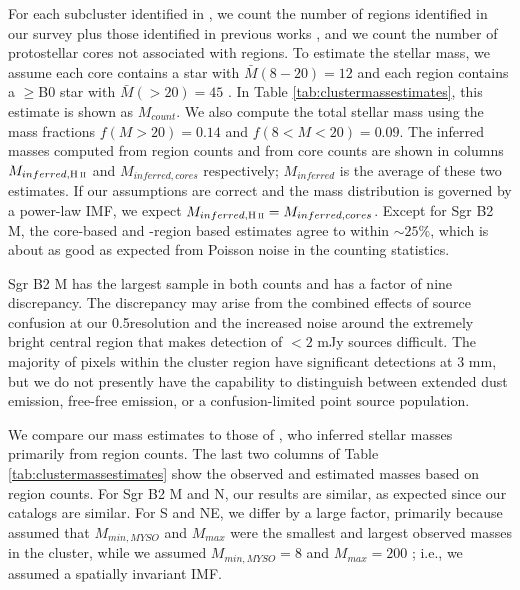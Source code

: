 \documentclass[twocolumn]{aastex61}
\begin{document}

For each subcluster identified in \citet[][see Figure
\ref{fig:overview}]{Schmiedeke2016a}, we count the number of \hii regions
identified in our
survey plus those identified in previous works \citep{de-Pree1996a}, and
we count the number of protostellar cores not associated with \hii regions.
To estimate the stellar mass, we assume each core contains a star
with $\bar{M}(8-20) = 12$ \msun and each \hii region contains a $\geq$B0 star
with $\bar{M}(>20) = 45$ \msun.  In Table \ref{tab:clustermassestimates},
this estimate is shown as $M_{count}$.  We also compute the total stellar
mass using the mass fractions $f(M>20) = 0.14$ and $f(8<M<20)=0.09$.
The inferred masses computed from \hii region counts and from core
counts are shown in columns $M_{inferred,\hii}$ and $M_{inferred,cores}$
respectively; $M_{inferred}$ is the average of these two estimates.
If our assumptions are correct and the mass distribution is governed
by a power-law IMF, we expect $M_{inferred,\hii} = M_{inferred,cores}$.
Except for Sgr B2 M, the core-based and \hii-region based estimates agree
to within $\sim25\%$, which is about as good as expected from Poisson
noise in the counting statistics.  

Sgr B2 M has the largest sample in both counts and has a factor of nine
discrepancy. The discrepancy may arise from the combined effects of source
confusion at our 0.5\arcsec resolution and the increased noise around the
extremely bright central region that makes detection of $<2$ mJy sources
difficult.  The majority of pixels within the cluster region have significant
detections at 3 mm, but we do not presently have the capability to distinguish
between extended dust emission, free-free emission, or a confusion-limited
point source population.

We compare our mass estimates to those of \citet{Schmiedeke2016a}, who inferred
stellar masses primarily from \hii region counts.  The last two columns of Table
\ref{tab:clustermassestimates} show the observed and estimated masses based on
\hii region counts.  For Sgr B2 M and N, our results are similar, as expected
since our catalogs are similar.  For S and NE, we differ by a large factor,
primarily because \citet{Schmiedeke2016a} assumed that $M_{min,MYSO}$ and $M_{max}$
were the smallest and largest observed masses in the cluster, while we assumed
$M_{min,MYSO}=8$ \msun and $M_{max}=200$ \msun; i.e., we assumed a spatially
invariant IMF.


\end{document}
